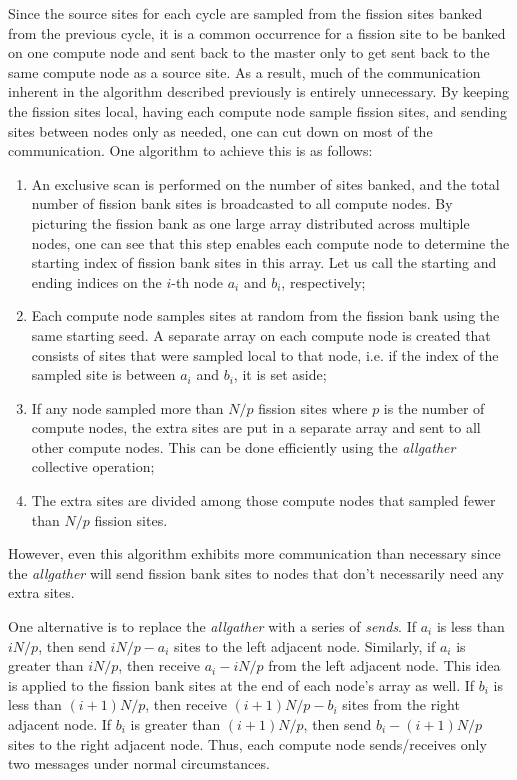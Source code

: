 Since the source sites for each cycle are sampled from the fission
sites banked from the previous cycle, it is a common occurrence for a
fission site to be banked on one compute node and sent back to the
master only to get sent back to the same compute node as a source
site. As a result, much of the communication inherent in the algorithm
described previously is entirely unnecessary. By keeping the fission
sites local, having each compute node sample fission sites, and
sending sites between nodes only as needed, one can cut down on most
of the communication. One algorithm to achieve this is as follows:

\begin{enumerate}
\item An exclusive scan is performed on the number of sites banked,
  and the total number of fission bank sites is broadcasted to all
  compute nodes. By picturing the fission bank as one large array
  distributed across multiple nodes, one can see that this step
  enables each compute node to determine the starting index of fission
  bank sites in this array. Let us call the starting and ending
  indices on the $i$-th node $a_i$ and $b_i$, respectively;
\item Each compute node samples sites at random from the fission bank
  using the same starting seed. A separate array on each compute node
  is created that consists of sites that were sampled local to that
  node, i.e. if the index of the sampled site is between $a_i$ and
  $b_i$, it is set aside;
\item If any node sampled more than $N/p$ fission sites where $p$ is
  the number of compute nodes, the extra sites are put in a separate
  array and sent to all other compute nodes. This can be done
  efficiently using the \emph{allgather} collective operation;
\item The extra sites are divided among those compute nodes that
  sampled fewer than $N/p$ fission sites.
\end{enumerate}

However, even this algorithm exhibits more communication than
necessary since the \emph{allgather} will send fission bank sites to
nodes that don't necessarily need any extra sites.

One alternative is to replace the \emph{allgather} with a series of
\emph{sends}. If $a_i$ is less than $iN/p$, then send $iN/p - a_i$
sites to the left adjacent node. Similarly, if $a_i$ is greater than
$iN/p$, then receive $a_i - iN/p$ from the left adjacent node. This
idea is applied to the fission bank sites at the end of each node's
array as well. If $b_i$ is less than $(i+1)N/p$, then receive
$(i+1)N/p - b_i$ sites from the right adjacent node. If $b_i$ is
greater than $(i+1)N/p$, then send $b_i - (i+1)N/p$ sites to the right
adjacent node. Thus, each compute node sends/receives only two
messages under normal circumstances.

